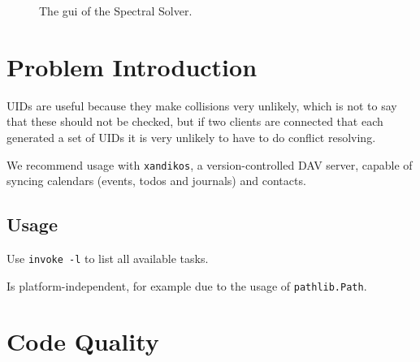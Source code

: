 \documentclass{prettytex/ox/mmsc-special-topic}
\title{\topictitle}
\author{Candidate \candidatenumber}
\date{\today}
\begin{document}
  \pagestyle{plain}
  \mmscSpecialHeader

  \begin{abstract}
    \label{abstract}
    In this project report we will review the central concepts utilised in the group work conducted to make progress in the \gls{pde} problem associated with the electrochemical model of a battery cell and present numerical results.
    \vspace*{0.2cm}

    \noindent
    \textbf{Our Goal:}
    Numerically obtain the solution $\{a(x, T), b(x, T)\}$.

    The Finite Difference schemes are implemented in Julia and Python, whereas the Spectral Method is implemented in C++.
  \end{abstract}

  \begin{figure}[H]
    \centering
    \caption{The \gls{gui} of the Spectral Solver.}
    \label{fig:gui}
  \end{figure}

  \pagebreak
  \pagestyle{normal}

  \section{Problem Introduction}
  \label{sec:introduction}

  UIDs are useful because they make collisions very unlikely, which is not to say that these should not be checked, but if two clients are connected that each generated a set of UIDs it is very unlikely to have to do conflict resolving.

  We recommend usage with \texttt{xandikos}, a version-controlled DAV server, capable of syncing calendars (events, todos and journals) and contacts.

  \subsection{Usage}
  Use \texttt{invoke -l} to list all available tasks.

  Is platform-independent, for example due to the usage of \texttt{pathlib.Path}.

  \section{Code Quality}
\end{document}

